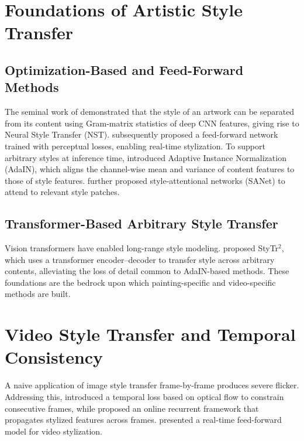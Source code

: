 \documentclass[letterpaper,twocolumn,10pt]{article}
\begin{document}
\section{Foundations of Artistic Style Transfer}
\label{sec:style}

\subsection{Optimization-Based and Feed-Forward Methods}

The seminal work of \citet{gatys2016image} demonstrated that the style of an artwork can
be separated from its content using Gram-matrix statistics of deep CNN features, giving
rise to Neural Style Transfer (NST). \citet{johnson2016perceptual} subsequently proposed
a feed-forward network trained with perceptual losses, enabling real-time stylization.
To support arbitrary styles at inference time, \citet{huang2017arbitrary} introduced
Adaptive Instance Normalization (AdaIN), which aligns the channel-wise mean and variance
of content features to those of style features. \citet{park2019arbitrary} further
proposed style-attentional networks (SANet) to attend to relevant style patches.

\subsection{Transformer-Based Arbitrary Style Transfer}

Vision transformers have enabled long-range style modeling.
\citet{deng2021stytr2} proposed StyTr$^2$, which uses a transformer encoder--decoder to
transfer style across arbitrary contents, alleviating the loss of detail common to
AdaIN-based methods. These foundations are the bedrock upon which painting-specific and
video-specific methods are built.

\section{Video Style Transfer and Temporal Consistency}
\label{sec:video}

A naive application of image style transfer frame-by-frame produces severe flicker.
Addressing this, \citet{ruder2016artistic} introduced a temporal loss based on optical
flow to constrain consecutive frames, while \citet{chen2017coherent} proposed an online
recurrent framework that propagates stylized features across frames.
\citet{huang2017realtime} presented a real-time feed-forward model for video stylization.
\end{document}
